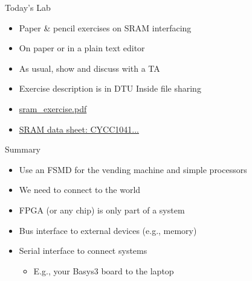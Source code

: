 \begin{frame}[fragile]{Today's Lab}
\begin{itemize}
\item Paper \& pencil exercises on SRAM interfacing
\item On paper or in a plain text editor
\item As usual, show and discuss with a TA
\item Exercise description is in DTU Inside file sharing
\item \href{https://cn.inside.dtu.dk/cnnet/filesharing/download/39a98e6a-f453-4aa7-98c4-cb13eae6c805}{sram\_exercise.pdf}
\item \href{https://cn.inside.dtu.dk/cnnet/filesharing/download/618360ca-01b4-42e4-86e2-765835963deb}{SRAM data sheet: CYCC1041...}
\end{itemize}
\end{frame}

\begin{frame}[fragile]{Summary}
\begin{itemize}
\item Use an FSMD for the vending machine and simple processors
\item We need to connect to the world
\item FPGA (or any chip) is only part of a system
\item Bus interface to external devices (e.g., memory)
\item Serial interface to connect systems
\begin{itemize}
\item E.g., your Basys3 board to the laptop
\end{itemize}
\end{itemize}
\end{frame}





